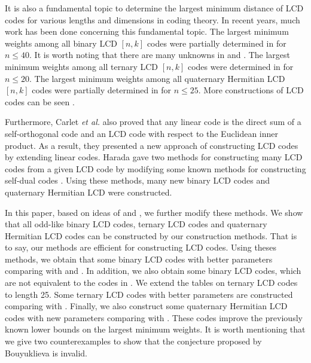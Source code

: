 \documentclass[12pt,twoside]{article}
\theoremstyle{plain}
\theoremstyle{definition}
\theoremstyle{remark}
\begin{document}
It is also a fundamental topic to determine the largest minimum distance of LCD codes for various lengths and dimensions in coding
theory.
In recent years, much work has been done concerning this fundamental topic.
The largest minimum weights among all binary LCD $[n,k]$ codes were partially determined
in \cite{bound-12,HS-BLCD-1-16,2-LCD-30,AH-BLCD-17-24,B-LCD-40,2-LCD-40} for $n\leq 40$. It is worth noting that there are many unknowns in \cite{B-LCD-40} and \cite{2-LCD-40}. The largest minimum weights among all ternary LCD $[n,k]$ codes were determined in \cite{AH-TLCD-1-10,ter-11-19} for $n\leq 20$. The largest minimum weights among all quaternary Hermitian LCD $[n,k]$ codes were partially determined in \cite{H-LCD-20,H-20,H-25} for $n\leq 25$.
More constructions of LCD codes can be seen \cite{H-LCD-IT,H-lCD-k=3,AHS-BLCD,H-lcd-IJQI,Lin-sok,LCD-10}.

Furthermore, Carlet {\it{et al.}} \cite{LCD-1} also proved that any linear code is the direct sum of a self-orthogonal code and an LCD code with respect to the Euclidean inner product. As a result, they presented a new approach of constructing LCD codes by extending linear codes.  Harada \cite{234-lcD} gave two methods for constructing many LCD codes from a given LCD code by modifying some known methods for constructing self-dual codes \cite{b-up-1,b-up-2,b-up-3,b-up-4,b-up-5,b-up-6,b-up-7}.
Using these methods, many new binary LCD codes and quaternary Hermitian LCD were constructed.

In this paper, based on ideas of \cite{LCD-1} and \cite{234-lcD}, we further modify these methods. We show that all odd-like binary LCD codes, ternary LCD codes and quaternary Hermitian LCD codes can be constructed by our construction methods. That is to say, our methods are efficient for constructing LCD codes.
Using theses methods,
we obtain that some binary LCD codes with better parameters comparing with \cite{B-LCD-40} and \cite{2-LCD-40}. In addition, we also obtain some binary LCD codes, which are not equivalent to the codes in \cite{2-LCD-40}.
We extend the tables on ternary LCD codes to length 25. Some ternary LCD codes with better parameters are constructed comparing with \cite{234-lcD}. Finally, we also construct some quaternary Hermitian LCD codes with new parameters comparing with \cite{H-25}. These codes improve the previously known lower bounds on the largest minimum weights.
It is worth mentioning that we give two counterexamples to show that the conjecture proposed by Bouyuklieva \cite{B-LCD-40} is invalid.
\end{document}
